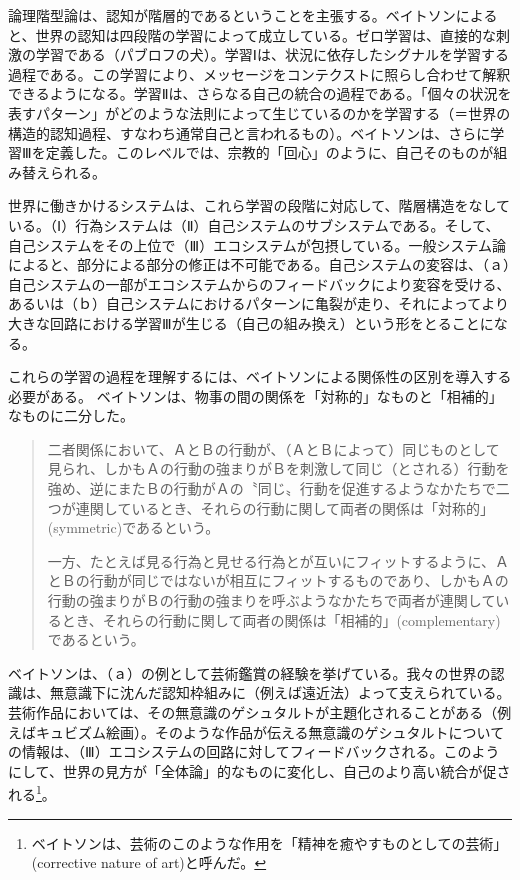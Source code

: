 \documentclass[b5j,twoside,twocolumn]{utarticle}
\begin{document}
論理階型論は、認知が階層的であるということを主張する。ベイトソンによると、世界の認知は四段階の学習によって成立している。ゼロ学習は、直接的な刺激の学習である（パブロフの犬）。学習Ⅰは、状況に依存したシグナルを学習する過程である。この学習により、メッセージをコンテクストに照らし合わせて解釈できるようになる。学習Ⅱは、さらなる自己の統合の過程である。「個々の状況を表すパターン」がどのような法則によって生じているのかを学習する（＝世界の構造的認知過程、すなわち通常自己と言われるもの）。ベイトソンは、さらに学習Ⅲを定義した。このレベルでは、宗教的「回心」のように、自己そのものが組み替えられる。


世界に働きかけるシステムは、これら学習の段階に対応して、階層構造をなしている。（Ⅰ）行為システムは（Ⅱ）自己システムのサブシステムである。そして、自己システムをその上位で（Ⅲ）エコシステムが包摂している。一般システム論によると、部分による部分の修正は不可能である。自己システムの変容は、（ａ）自己システムの一部がエコシステムからのフィードバックにより変容を受ける、あるいは（ｂ）自己システムにおけるパターンに亀裂が走り、それによってより大きな回路における学習Ⅲが生じる（自己の組み換え）という形をとることになる。


これらの学習の過程を理解するには、ベイトソンによる関係性の区別を導入する必要がある。
ベイトソンは、物事の間の関係を「対称的」なものと「相補的」なものに二分した。
\begin{quote}
二者関係において、ＡとＢの行動が、（ＡとＢによって）同じものとして見られ、しかもＡの行動の強まりがＢを刺激して同じ（とされる）行動を強め、逆にまたＢの行動がＡの〝同じ〟行動を促進するようなかたちで二つが連関しているとき、それらの行動に関して両者の関係は「対称的」(symmetric)であるという。


一方、たとえば見る行為と見せる行為とが互いにフィットするように、ＡとＢの行動が同じではないが相互にフィットするものであり、しかもＡの行動の強まりがＢの行動の強まりを呼ぶようなかたちで両者が連関しているとき、それらの行動に関して両者の関係は「相補的」(complementary)であるという。%
\end{quote}


ベイトソンは、（ａ）の例として芸術鑑賞の経験を挙げている。我々の世界の認識は、無意識下に沈んだ認知枠組みに（例えば遠近法）よって支えられている。芸術作品においては、その無意識のゲシュタルトが主題化されることがある（例えばキュビズム絵画）。そのような作品が伝える無意識のゲシュタルトについての情報は、（Ⅲ）エコシステムの回路に対してフィードバックされる。このようにして、世界の見方が「全体論」的なものに変化し、自己のより高い統合が促される\footnote{ベイトソンは、芸術のこのような作用を「精神を癒やすものとしての芸術」(corrective nature of art)と呼んだ。}。
\end{document}
